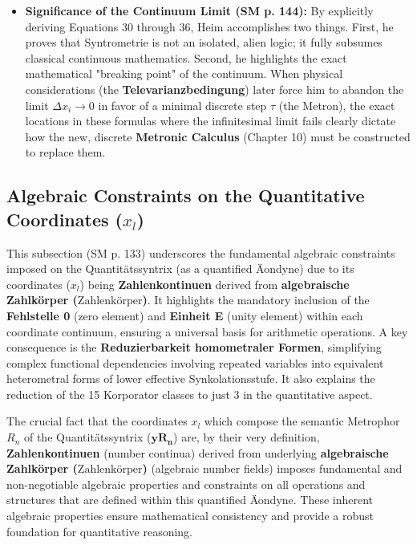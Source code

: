 \documentclass[12pt]{article}
\newcommand{\quantitaetssyntrix}{\bm{yR_n}}
\newcommand{\zahlenkoerper}{\text{Zahlenkörper}}
\newcommand{\semantischermetrophor}{R_n}
\begin{document}
\begin{itemize}
    \item \textbf{Significance of the Continuum Limit (SM p. 144):}
    By explicitly deriving Equations 30 through 36, Heim accomplishes two things. First, he proves that Syntrometrie is not an isolated, alien logic; it fully subsumes classical continuous mathematics. Second, he highlights the exact mathematical "breaking point" of the continuum. When physical considerations (the \textbf{Televarianzbedingung}) later force him to abandon the limit \( \Delta x_i \to 0 \) in favor of a minimal discrete step \( \tau \) (the Metron), the exact locations in these formulas where the infinitesimal limit fails clearly dictate how the new, discrete \textbf{Metronic Calculus} (Chapter 10) must be constructed to replace them.
\end{itemize}
\subsection{Algebraic Constraints on the Quantitative Coordinates (\texorpdfstring{\( x_l \)}{x\_l})}
\label{sec:algebraic_constraints_aeondyne}

This subsection (SM p. 133) underscores the fundamental algebraic constraints imposed on the Quantitätssyntrix (as a quantified Äondyne) due to its coordinates (\(x_l\)) being \textbf{Zahlenkontinuen} derived from \textbf{algebraische Zahlkörper (\(\zahlenkoerper\))}. It highlights the mandatory inclusion of the \textbf{Fehlstelle 0} (zero element) and \textbf{Einheit E} (unity element) within each coordinate continuum, ensuring a universal basis for arithmetic operations. A key consequence is the \textbf{Reduzierbarkeit homometraler Formen}, simplifying complex functional dependencies involving repeated variables into equivalent heterometral forms of lower effective Synkolationsstufe. It also explains the reduction of the 15 Korporator classes to just 3 in the quantitative aspect.

The crucial fact that the coordinates \( x_l \) which compose the semantic Metrophor \( \semantischermetrophor \) of the Quantitätssyntrix (\(\quantitaetssyntrix\)) are, by their very definition, \textbf{Zahlenkontinuen} (number continua) derived from underlying \textbf{algebraische Zahlkörper (\(\zahlenkoerper\))} (algebraic number fields) imposes fundamental and non-negotiable algebraic properties and constraints on all operations and structures that are defined within this quantified Äondyne. These inherent algebraic properties ensure mathematical consistency and provide a robust foundation for quantitative reasoning.
\end{document}
